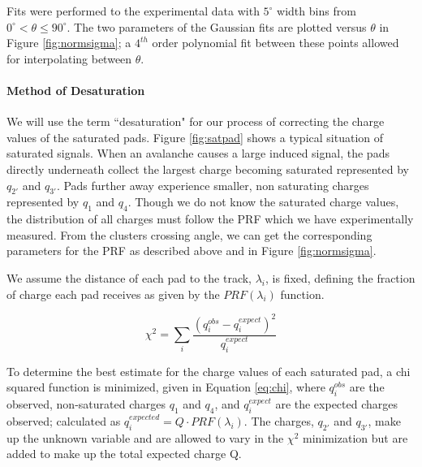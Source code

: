 \documentclass[review]{elsarticle}
\begin{document}
Fits were performed to the experimental data with  $5^{\circ}$ width bins from $0^{\circ} < \theta \leq 90^{\circ}$. The two parameters of the Gaussian fits are plotted versus $\theta$ in Figure \ref{fig:normsigma}; a $4^{th}$ order polynomial fit between these points allowed for interpolating between $\theta$.

\paragraph{Method of Desaturation}
We will use the term ``desaturation" for our process of correcting the charge values of the saturated pads. Figure \ref{fig:satpad} shows a typical situation of saturated signals. When an avalanche causes a large induced signal, the pads directly underneath collect the largest charge becoming saturated represented by $q_{2'}$ and $q_{3'}$. Pads further away experience smaller, non saturating charges represented by  $q_{1}$ and $q_{4}$. Though we do not know the saturated charge values, the distribution of all charges must follow the PRF which we have experimentally measured. From the clusters crossing angle, we can get the corresponding parameters for the PRF as described above and in Figure \ref{fig:normsigma}.

We assume the distance of each pad to the track, $\lambda_i$, is fixed, defining the fraction of charge each pad receives as given by the $PRF(\lambda_i)$ function. 


\begin{equation}\label{eq:chi}
\chi^2 = \sum_i \frac{(q_i^{obs} - q_i^{expect})^2}{q_i^{expect}}
\end{equation}

To determine the best estimate for the charge values of each saturated pad, a chi squared function is minimized, given in  Equation \ref{eq:chi}, where $q_i^{obs}$ are the observed, non-saturated charges $q_{1}$ and $q_{4}$, and $q_i^{expect}$ are the expected charges observed; calculated as $ q_i^{expected} = Q\cdot PRF(\lambda_i)$. The charges, $q_{2'}$ and $q_{3'}$, make up the unknown variable and are allowed to vary in the $\chi^2$ minimization but are added to make up the total expected charge Q.
\end{document}

